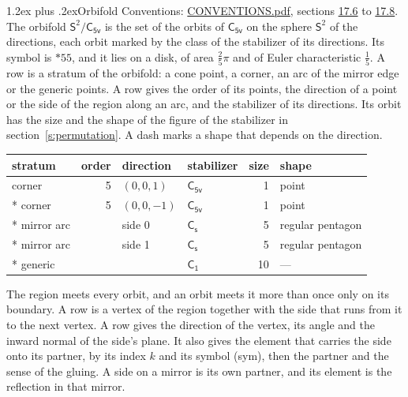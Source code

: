 \documentclass[10pt,a4paper]{article}
\makeatletter
\renewcommand\section{\@startsection{section}{1}{\z@}{-3ex plus -1ex minus -.2ex}%
  {1.2ex plus .2ex}{\normalfont\large\sffamily\bfseries\color{parttitle}}}
\numberwithin{equation}{section}
\newcommand{\grp}[1]{\mathsf{#1}}
\newcommand{\orbname}[1]{#1}
\newcommand{\dirvec}[3]{(#1, #2, #3)}
\newcommand{\twosphere}{\mathsf{S}^{2}}
\makeatother
\begin{document}
\section{Orbifold}\label{s:orbifold}
Conventions: \href{../../CONVENTIONS.pdf}{CONVENTIONS.pdf}, sections \href{../../CONVENTIONS.pdf\#conv.17.6}{17.6} to \href{../../CONVENTIONS.pdf\#conv.17.8}{17.8}.
The orbifold $\twosphere/\grp{C_{5v}}$ is the set of the orbits of $\grp{C_{5v}}$ on the sphere $\twosphere$ of the directions, each orbit marked by the class of the stabilizer of its directions. Its symbol is $\orbname{{\ast}55}$, and it lies on a disk, of area $\tfrac{2}{5}\pi$ and of Euler characteristic $\tfrac{1}{5}$.
\leavevmode\label{n:head.stratum}\label{n:head.order.point}\label{n:head.direction}\label{n:head.stabilizer}\label{n:head.size.orbit}\label{n:head.shape}A row is a stratum of the orbifold: a cone point, a corner, an arc of the mirror edge or the generic points. A row gives the order of its points, the direction of a point or the side of the region along an arc, and the stabilizer of its directions. Its orbit has the size and the shape of the figure of the stabilizer in section~\ref{s:permutation}. A dash marks a shape that depends on the direction.
{\small\setlength{\tabcolsep}{4pt}\begin{longtable}{@{}lrllrl@{}}\toprule
stratum & order & direction & stabilizer & size & shape\\\midrule\endhead
\bottomrule\endfoot\endlastfoot
corner & 5 & $\dirvec{0}{0}{1}$ & \href{C5v.pdf}{$\grp{C_{5v}}$} & 1 & point\\*
corner & 5 & $\dirvec{0}{0}{-1}$ & \href{C5v.pdf}{$\grp{C_{5v}}$} & 1 & point\\*
mirror arc &  & side 0 & \href{C1v.pdf}{$\grp{C_{s}}$} & 5 & regular pentagon\\*
mirror arc &  & side 1 & \href{C1v.pdf}{$\grp{C_{s}}$} & 5 & regular pentagon\\*
generic &  &  & \href{C1.pdf}{$\grp{C_{1}}$} & 10 & ---\\
\bottomrule\end{longtable}}
\leavevmode\label{n:head.vertex.region}\label{n:head.angle}\label{n:head.normal.side}\label{n:head.partner}\label{n:head.sense}The region meets every orbit, and an orbit meets it more than once only on its boundary. A row is a vertex of the region together with the side that runs from it to the next vertex. A row gives the direction of the vertex, its angle and the inward normal of the side's plane. It also gives the element that carries the side onto its partner, by its index $k$ and its symbol (sym), then the partner and the sense of the gluing. A side on a mirror is its own partner, and its element is the reflection in that mirror.
\end{document}
